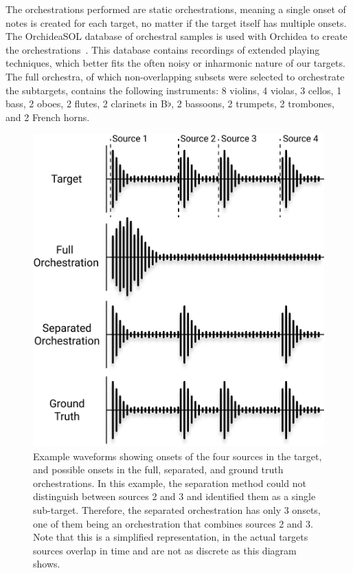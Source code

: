 \documentclass{article}
\begin{document}
    The orchestrations performed are static orchestrations, meaning a single onset of notes is created for each target, no matter if the target itself has multiple onsets. The OrchideaSOL database of orchestral samples is used with Orchidea to create the orchestrations~\cite{Cella2020c}. This database contains recordings of extended playing techniques, which better fits the often noisy or inharmonic nature of our targets. The full orchestra, of which non-overlapping subsets were selected to orchestrate the subtargets, contains the following instruments: 8 violins, 4 violas, 3 cellos, 1 bass, 2 oboes, 2 flutes, 2 clarinets in B$\flat$, 2 bassoons, 2 trumpets, 2 trombones, and 2 French horns.
    
    \begin{figure}[t]
    \centering
      \includegraphics[width=\columnwidth]{figures/orch.jpg}
      \caption{Example waveforms showing onsets of the four sources in the target, and possible onsets in the full, separated, and ground truth orchestrations. In this example, the separation method could not distinguish between sources 2 and 3 and identified them as a single sub-target. Therefore, the separated orchestration has only 3 onsets, one of them being an orchestration that combines sources 2 and 3. Note that this is a simplified representation, in the actual targets sources overlap in time and are not as discrete as this diagram shows.}\label{fig:orchestrations}
    \end{figure}    
    
\end{document}
